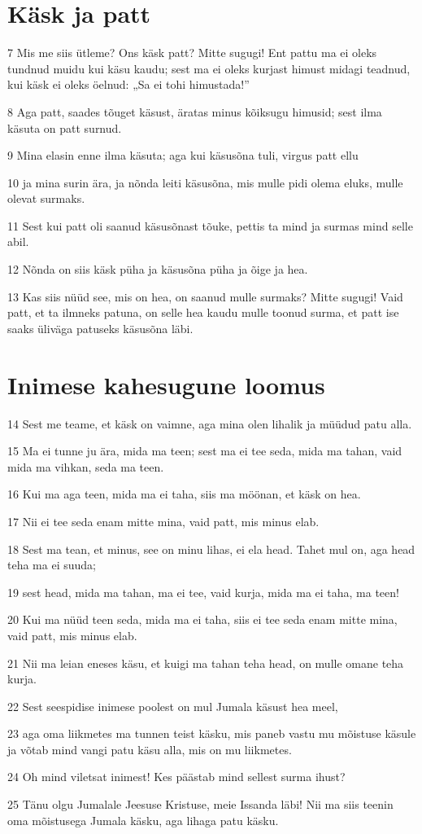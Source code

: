 \section*{Käsk ja patt}

\par 7 Mis me siis ütleme? Ons käsk patt? Mitte sugugi! Ent pattu ma ei oleks tundnud muidu kui käsu kaudu; sest ma ei oleks kurjast himust midagi teadnud, kui käsk ei oleks öelnud: „Sa ei tohi himustada!”
\par 8 Aga patt, saades tõuget käsust, äratas minus kõiksugu himusid; sest ilma käsuta on patt surnud.
\par 9 Mina elasin enne ilma käsuta; aga kui käsusõna tuli, virgus patt ellu
\par 10 ja mina surin ära, ja nõnda leiti käsusõna, mis mulle pidi olema eluks, mulle olevat surmaks.
\par 11 Sest kui patt oli saanud käsusõnast tõuke, pettis ta mind ja surmas mind selle abil.
\par 12 Nõnda on siis käsk püha ja käsusõna püha ja õige ja hea.
\par 13 Kas siis nüüd see, mis on hea, on saanud mulle surmaks? Mitte sugugi! Vaid patt, et ta ilmneks patuna, on selle hea kaudu mulle toonud surma, et patt ise saaks üliväga patuseks käsusõna läbi.

\section*{Inimese kahesugune loomus}

\par 14 Sest me teame, et käsk on vaimne, aga mina olen lihalik ja müüdud patu alla.
\par 15 Ma ei tunne ju ära, mida ma teen; sest ma ei tee seda, mida ma tahan, vaid mida ma vihkan, seda ma teen.
\par 16 Kui ma aga teen, mida ma ei taha, siis ma möönan, et käsk on hea.
\par 17 Nii ei tee seda enam mitte mina, vaid patt, mis minus elab.
\par 18 Sest ma tean, et minus, see on minu lihas, ei ela head. Tahet mul on, aga head teha ma ei suuda;
\par 19 sest head, mida ma tahan, ma ei tee, vaid kurja, mida ma ei taha, ma teen!
\par 20 Kui ma nüüd teen seda, mida ma ei taha, siis ei tee seda enam mitte mina, vaid patt, mis minus elab.
\par 21 Nii ma leian eneses käsu, et kuigi ma tahan teha head, on mulle omane teha kurja.
\par 22 Sest seespidise inimese poolest on mul Jumala käsust hea meel,
\par 23 aga oma liikmetes ma tunnen teist käsku, mis paneb vastu mu mõistuse käsule ja võtab mind vangi patu käsu alla, mis on mu liikmetes.
\par 24 Oh mind viletsat inimest! Kes päästab mind sellest surma ihust?
\par 25 Tänu olgu Jumalale Jeesuse Kristuse, meie Issanda läbi! Nii ma siis teenin oma mõistusega Jumala käsku, aga lihaga patu käsku.


